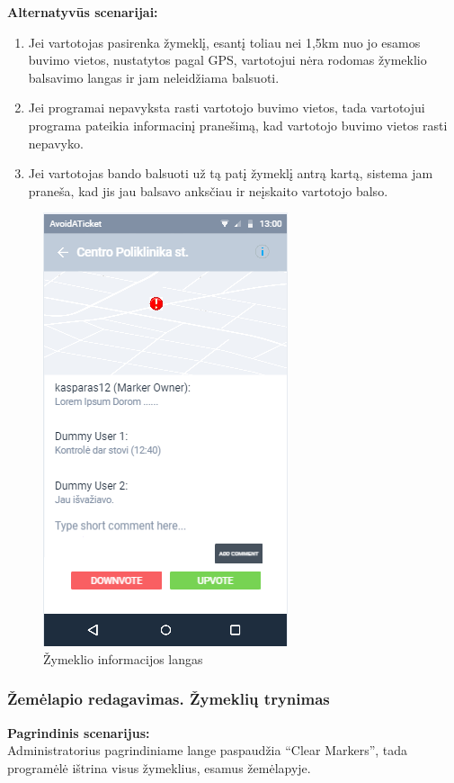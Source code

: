 \documentclass{VUMIFPSkursinis}
\begin{document}
	\textbf{Alternatyvūs scenarijai:}
	\begin{enumerate}[itemsep=-2mm]
		\item Jei vartotojas pasirenka žymeklį, esantį toliau nei 1,5km nuo jo esamos buvimo vietos, nustatytos pagal GPS, vartotojui nėra rodomas žymeklio balsavimo langas ir jam neleidžiama balsuoti.
		\item Jei programai nepavyksta rasti vartotojo buvimo vietos, tada vartotojui programa pateikia informacinį pranešimą, kad vartotojo buvimo vietos rasti nepavyko.
		\item Jei vartotojas bando balsuoti už tą patį žymeklį antrą kartą, sistema jam praneša, kad jis jau balsavo anksčiau ir neįskaito vartotojo balso.
	\end{enumerate} 
	\begin{figure}[H]
				\centering
				\includegraphics[scale=0.6]{img/mockup_markerInfoWindow}
				\caption{Žymeklio informacijos langas}
				\label{img:Žymeklio informacijos langas}
			\end{figure}

\subsubsection{Žemėlapio redagavimas. Žymeklių trynimas}
	\textbf{Pagrindinis scenarijus:}\\
	Administratorius pagrindiniame lange paspaudžia “Clear Markers”, tada programėlė ištrina visus žymeklius, esamus žemėlapyje.
\end{document}
